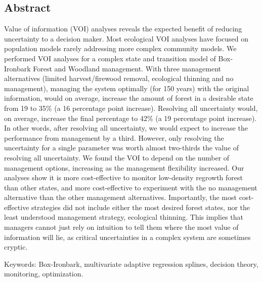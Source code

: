
\subsection*{Abstract}\label{abstract}

Value of information (VOI) analyses reveals the expected benefit of reducing uncertainty to a decision maker. Most ecological VOI analyses have focused on population models rarely addressing more complex community models. We performed VOI analyses for a complex state and transition model of Box-Ironbark Forest and Woodland management. With three management alternatives (limited harvest/firewood removal, ecological thinning and no management), managing the system optimally (for 150 years) with the original information, would on average, increase the amount of forest in a desirable state from 19 to 35\% (a 16 percentage point increase). Resolving all uncertainty would, on average, increase the final percentage to 42\% (a 19 percentage point increase). In other words, after resolving all uncertainty, we would expect to increase the performance from management by a third. However, only resolving the uncertainty for a single parameter was worth almost two-thirds the value of resolving all uncertainty. We found the VOI to depend on the number of management options, increasing as the management flexibility increased. Our analyses show it is more cost-effective to monitor low-density regrowth forest than other states, and more cost-effective to experiment with the no management alternative than the other management alternatives. Importantly, the most cost-effective strategies did not include either the most desired forest states, nor the least understood management strategy, ecological thinning. This implies that managers cannot just rely on intuition to tell them where the most value of information will lie, as critical uncertainties in a complex system are sometimes cryptic.

Keywords: Box-Ironbark, multivariate adaptive regression splines, decision theory, monitoring, optimization.
